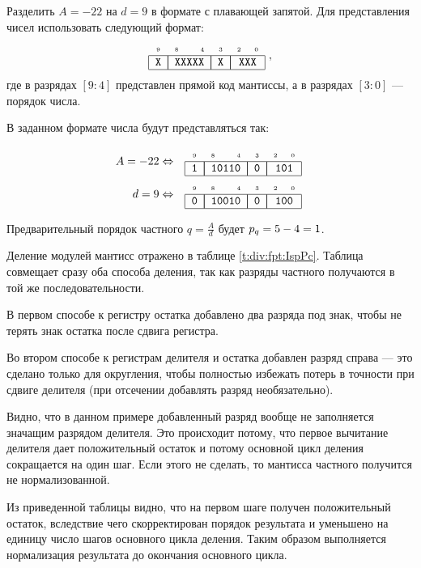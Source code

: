 \begin{Example}
    Разделить $A=-22$ на $d=9$ в формате с плавающей запятой. Для представления чисел использовать следующий формат:
    \[\FloatMyOrderX{X}{XXXXX}{X}{XXX},\]
    где в разрядах $[9:4]$ представлен прямой код мантиссы, а в разрядах $[3:0]$ --- порядок числа.
\end{Example}
\begin{Solve}
    В заданном формате числа будут представляться так:
    
    \begin{align*}
        A=-22 & \Leftrightarrow & \FloatMyOrderX{1}{10110}{0}{101}\\
          d=9 & \Leftrightarrow & \FloatMyOrderX{0}{10010}{0}{100}
    \end{align*}
    
    Предварительный порядок частного $q=\frac{A}{d}$ будет $p_{q}=5-4=1$.
    
    Деление модулей мантисс отражено в таблице \ref{t:div:fpt:IspPc}. Таблица совмещает сразу оба способа деления, так как разряды частного получаются в той же последовательности.
    
    В первом способе к регистру остатка добавлено два разряда под знак, чтобы не терять знак остатка после сдвига регистра.
    
    Во втором способе к регистрам делителя и остатка добавлен разряд справа --- это сделано только для округления, чтобы полностью избежать потерь в точности при сдвиге делителя (при отсечении добавлять разряд необязательно). 
    
    Видно, что в данном примере добавленный разряд вообще не заполняется значащим разрядом делителя. Это происходит потому, что первое вычитание делителя дает положительный остаток и потому основной цикл деления сокращается на один шаг. Если этого не сделать, то мантисса частного получится не нормализованной.
    
    Из приведенной таблицы видно, что на первом шаге получен положительный остаток, вследствие чего скорректирован порядок результата и уменьшено на единицу число шагов основного цикла деления. Таким образом выполняется нормализация результата до окончания основного цикла.
    

\end{Solve}
